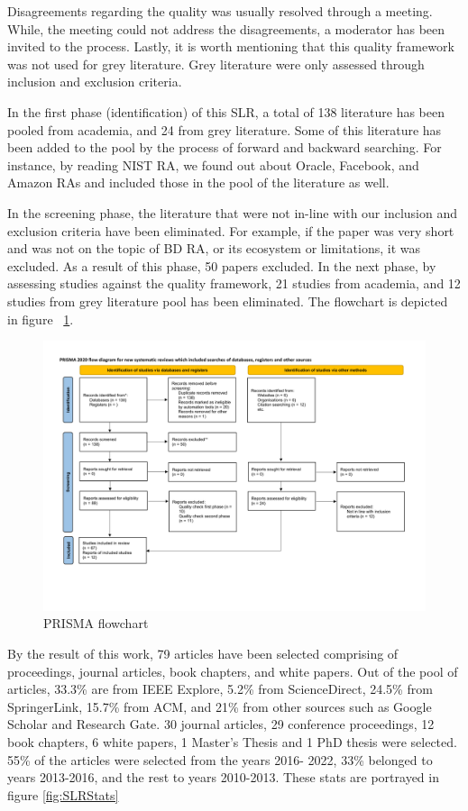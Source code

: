 \documentclass{ieeeaccess}
\begin{document}
Disagreements regarding the quality was usually resolved through a meeting. While, the meeting could not address the disagreements, a moderator has been invited to the process. Lastly, it is worth mentioning that this quality framework was not used for grey literature. Grey literature were only assessed through inclusion and exclusion criteria. 

In the first phase (identification) of this SLR, a total of 138 literature has been pooled from academia, and 24 from grey literature. Some of this literature has been added to the pool by the process of forward and backward searching. For instance, by reading NIST RA, we found out about Oracle, Facebook, and Amazon RAs and included those in the pool of the literature as well. 

In the screening phase, the literature that were not in-line with our inclusion and exclusion criteria have been eliminated. For example, if the paper was very short and was not on the topic of BD RA, or its ecosystem or limitations, it was excluded. As a result of this phase, 50 papers excluded. In the next phase, by assessing studies against the quality framework, 21 studies from academia, and 12 studies from grey literature pool has been eliminated. The flowchart is depicted in figure ~\ref{fig:PRISMA}.


\begin{figure}[t]
    \includegraphics[width=18cm]{PRISMA/PRISMA_Flow_Diagram-2.pdf}
    \caption{PRISMA flowchart}
    \label{fig:PRISMA}
\end{figure}


By the result of this work, 79 articles have been selected comprising of proceedings, journal articles, book chapters, and white papers. Out of the pool of articles, 33.3\% are from IEEE Explore, 5.2\% from ScienceDirect, 24.5\% from SpringerLink, 15.7\% from ACM, and 21\% from other sources such as Google Scholar and Research Gate. 30 journal articles, 29 conference proceedings, 12 book chapters, 6 white papers, 1 Master’s Thesis and 1 PhD thesis were selected. 55\% of the articles were selected from the years 2016- 2022, 33\% belonged to years 2013-2016, and the rest to years 2010-2013. These stats are portrayed in figure \ref{fig:SLRStats}
\end{document}
